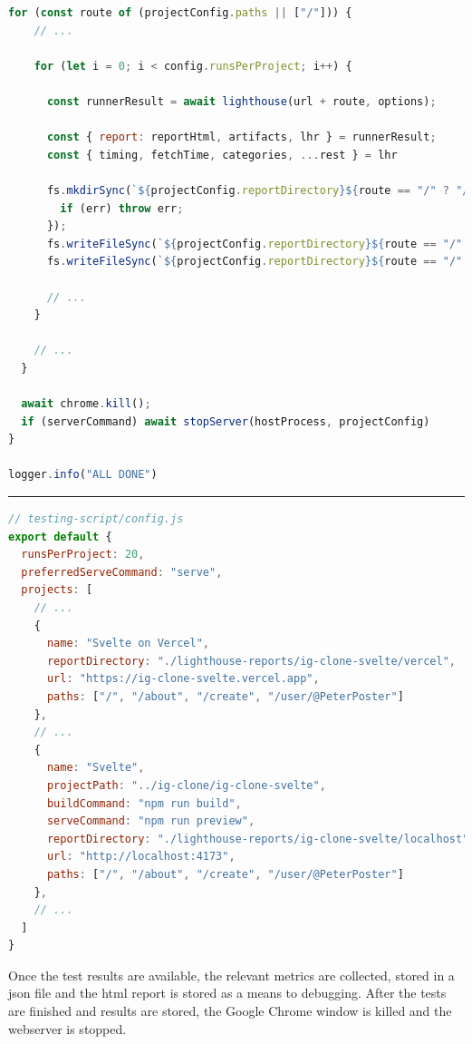 \documentclass[a4paper, 12pt]{article}
\begin{document}
\begin{lstlisting}[caption={Automation script for Lighthouse tests}, language=JavaScript, label={lst:lighthouse-script}]
  for (const route of (projectConfig.paths || ["/"])) {
    // ...

    for (let i = 0; i < config.runsPerProject; i++) {

      const runnerResult = await lighthouse(url + route, options);

      const { report: reportHtml, artifacts, lhr } = runnerResult;
      const { timing, fetchTime, categories, ...rest } = lhr

      fs.mkdirSync(`${projectConfig.reportDirectory}${route == "/" ? "/index" : route}`, { recursive: true }, (err) => {
        if (err) throw err;
      });
      fs.writeFileSync(`${projectConfig.reportDirectory}${route == "/" ? "/index" : route}/lighthouse-report-${new URL(url).hostname}-${dateToUriSafeString(new Date())}.html`, reportHtml);
      fs.writeFileSync(`${projectConfig.reportDirectory}${route == "/" ? "/index" : route}/lighthouse-report-${new URL(url).hostname}-${dateToUriSafeString(new Date())}.json`, JSON.stringify({ artifacts, lhr }, null, 2));

      // ...
    }

    // ...
  }

  await chrome.kill();
  if (serverCommand) await stopServer(hostProcess, projectConfig)
}

logger.info("ALL DONE")
\end{lstlisting}
\hrule
\begin{lstlisting}[caption={Test configuration for Lighthouse tests}, language=JavaScript, label={lst:lighthouse-config}]
// testing-script/config.js
export default {
  runsPerProject: 20,
  preferredServeCommand: "serve",
  projects: [
    // ...
    {
      name: "Svelte on Vercel",
      reportDirectory: "./lighthouse-reports/ig-clone-svelte/vercel",
      url: "https://ig-clone-svelte.vercel.app",
      paths: ["/", "/about", "/create", "/user/@PeterPoster"]
    },
    // ...
    {
      name: "Svelte",
      projectPath: "../ig-clone/ig-clone-svelte",
      buildCommand: "npm run build",
      serveCommand: "npm run preview",
      reportDirectory: "./lighthouse-reports/ig-clone-svelte/localhost",
      url: "http://localhost:4173",
      paths: ["/", "/about", "/create", "/user/@PeterPoster"]
    },
    // ...
  ]
}
\end{lstlisting}
\vspace{1cm}

Once the test results are available, the relevant metrics are collected, stored in a \acrshort{json} file and the \acrshort{html} report is stored as a means to debugging.
After the tests are finished and results are stored, the Google Chrome window is killed and the webserver is stopped.
\end{document}
